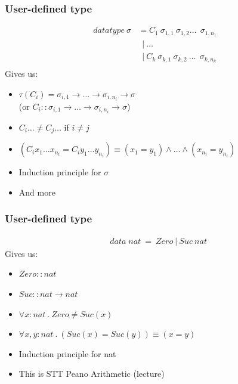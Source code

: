 \documentclass{beamer}
\newcommand*{\mdot}{\ensuremath{\ . \ }}
\begin{document}
  \begin{frame}
    \frametitle{User-defined type}
    \begin{equation*}
      \begin{split}
        datatype \ \sigma & = C_1 \ \sigma_{1,1} \ \sigma_{1, 2} \dots \ \ \sigma_{1, n_1} \\
        & \; \ | \ \dots \\
        & \; \ | \ C_k \ \sigma_{k,1} \ \sigma_{k, 2}  \ \dots \ \ \sigma_{k, n_k} \\
      \end{split}
    \end{equation*}
    Gives us:
    \begin{itemize}
      \item $\tau(C_i) = \sigma_{i, 1} \rightarrow \dots \rightarrow \sigma_{i, n_i} \rightarrow \sigma$ \\
      (or $C_i :: \sigma_{i, 1} \rightarrow \dots \rightarrow \sigma_{i, n_i} \rightarrow \sigma$)
      \item $C_i \dots \neq C_j \dots$ if $i \neq j$
      \item $(C_i x_1 \dots x_{n_i} = C_i y_1 \dots y_{n_i}) \equiv (x_1 = y_1) \land \dots \land (x_{n_i} = y_{n_i})$
      \item Induction principle for $\sigma$
      \item And more
    \end{itemize}

  \end{frame}

  \begin{frame}
    \frametitle{User-defined type}
    \begin{equation*}
      \begin{split}
        & data \; nat \ = \ Zero \ | \ Suc \ nat
      \end{split}
    \end{equation*}
    Gives us:
    \begin{itemize}
      \item $Zero :: nat$
      \item $Suc :: nat \rightarrow nat$
      \item $\forall x : nat \mdot Zero \neq Suc (x)$
      \item $\forall x, y : nat \mdot (Suc(x) = Suc(y)) \equiv (x = y)$
      \item Induction principle for nat
      \item This is STT Peano Arithmetic (lecture)
    \end{itemize}

  \end{frame}
\end{document}
